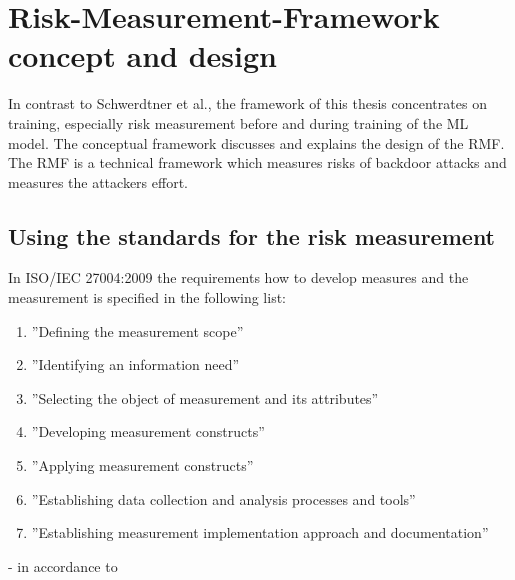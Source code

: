 \section{Risk-Measurement-Framework concept and design}
\label{sec:conFrame}

In contrast to Schwerdtner et al., the framework of this thesis concentrates on training, especially risk measurement before and during training of the ML model. The conceptual framework discusses and explains the design of the RMF. The RMF is a technical framework which measures risks of backdoor attacks and measures the attackers effort.

\subsection{Using the standards for the risk measurement}
\label{sec:standard}

In ISO/IEC 27004:2009 the requirements how to develop measures and the measurement is specified in the following list:

\begin{enumerate}[label=(\alph*)]
  \item \label{itm:a} ''Defining the measurement scope''
  \item \label{itm:b} ''Identifying an information need''
  \item \label{itm:c} ''Selecting the object of measurement and its attributes''
  \item \label{itm:d} ''Developing measurement constructs''
  \item \label{itm:e} ''Applying measurement constructs''
  \item \label{itm:f} ''Establishing data collection and analysis processes and tools''
  \item \label{itm:g} ''Establishing measurement implementation approach and documentation''
\end{enumerate}

\hfill - in accordance to \cite{ISO_27004_2009} \\


